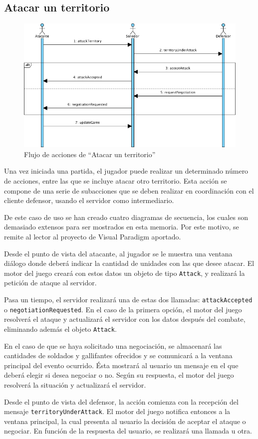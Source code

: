 \subsection{Atacar un territorio}

\begin{figure}[ht]
\centering
\includegraphics[scale=0.6]{img/ch03devel-attack.png}
\caption{Flujo de acciones de ``Atacar un territorio''}
\end{figure}

Una vez iniciada una partida, el jugador puede realizar un determinado número de
acciones, entre las que se incluye atacar otro territorio. Esta acción se
compone de una serie de subacciones que se deben realizar en coordinación con
el cliente defensor, usando el servidor como intermediario.

De este caso de uso se han creado cuatro diagramas de secuencia, los cuales son
demasiado extensos para ser mostrados en esta memoria. Por este motivo, se
remite al lector al proyecto de Visual Paradigm aportado.

Desde el punto de vista del atacante, al jugador se le muestra una ventana
diálogo donde deberá indicar la cantidad de unidades con las que desee atacar.
El motor del juego creará con estos datos un objeto de tipo \texttt{Attack}, y
realizará la petición de ataque al servidor.

Pasa un tiempo, el servidor realizará una de estas dos llamadas:
\texttt{attackAccepted} o \texttt{negotiationRequested}. En el caso de la
primera opción, el motor del juego resolverá el ataque y actualizará el
servidor con los datos después del combate, eliminando además el objeto
\texttt{Attack}.

En el caso de que se haya solicitado una negociación, se almacenará las
cantidades de soldados y gallifantes ofrecidos y se comunicará a la ventana
principal del evento ocurrido. Ésta mostrará al usuario un mensaje en el que
deberá elegir si desea negociar o no. Según su respuesta, el motor del juego
resolverá la situación y actualizará el servidor.

Desde el punto de vista del defensor, la acción comienza con la recepción del
mensaje \texttt{territoryUnderAttack}. El motor del juego notifica entonces a
la ventana principal, la cual presenta al usuario la decisión de aceptar el
ataque o negociar. En función de la respuesta del usuario, se realizará una
llamada u otra.